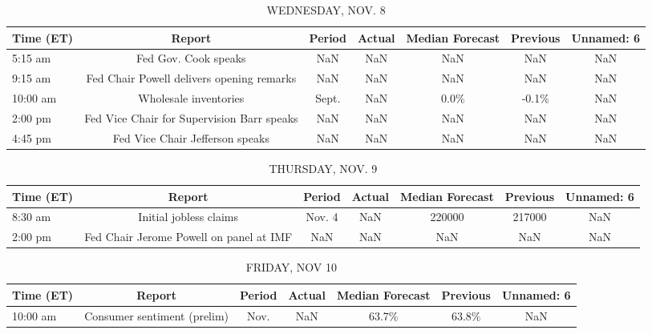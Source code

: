\documentclass{article}%
\begin{document}
\begin{table}[htbp]%
\caption{WEDNESDAY, NOV. 8}%
\centering%
\begin{adjustbox}{width=1\textwidth}%
\begin{tabular}{lcccccc}
\toprule
Time (ET) &                                     Report & Period & Actual & Median Forecast & Previous & Unnamed: 6 \\
\midrule
  5:15 am &                       Fed Gov. Cook speaks &    NaN &    NaN &             NaN &      NaN &        NaN \\
  9:15 am &  Fed Chair Powell delivers opening remarks &    NaN &    NaN &             NaN &      NaN &        NaN \\
 10:00 am &                      Wholesale inventories &  Sept. &    NaN &            0.0\% &    -0.1\% &        NaN \\
  2:00 pm & Fed Vice Chair for Supervision Barr speaks &    NaN &    NaN &             NaN &      NaN &        NaN \\
  4:45 pm &            Fed Vice Chair Jefferson speaks &    NaN &    NaN &             NaN &      NaN &        NaN \\
\bottomrule
\end{tabular}
%
\end{adjustbox}%
\end{table}

%


\begin{table}[htbp]%
\caption{THURSDAY, NOV. 9}%
\centering%
\begin{adjustbox}{width=1\textwidth}%
\begin{tabular}{lcccccc}
\toprule
Time (ET) &                                  Report & Period & Actual & Median Forecast & Previous & Unnamed: 6 \\
\midrule
  8:30 am &                  Initial jobless claims & Nov. 4 &    NaN &          220000 &   217000 &        NaN \\
  2:00 pm & Fed Chair Jerome Powell on panel at IMF &    NaN &    NaN &             NaN &      NaN &        NaN \\
\bottomrule
\end{tabular}
%
\end{adjustbox}%
\end{table}

%


\begin{table}[htbp]%
\caption{FRIDAY, NOV 10}%
\centering%
\begin{adjustbox}{width=1\textwidth}%
\begin{tabular}{lcccccc}
\toprule
Time (ET) &                      Report & Period & Actual & Median Forecast & Previous & Unnamed: 6 \\
\midrule
 10:00 am & Consumer sentiment (prelim) &   Nov. &    NaN &           63.7\% &    63.8\% &        NaN \\
\bottomrule
\end{tabular}
%
\end{adjustbox}%
\end{table}
\end{document}
